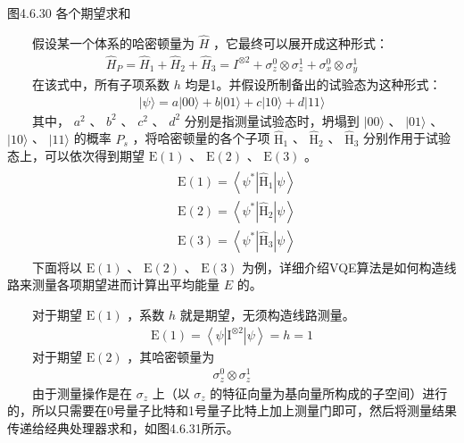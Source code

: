 \documentclass[a4paper,11pt,english]{sphinxmanual}
\begin{document}
\begin{center}图4.6.30 各个期望求和
\end{center}
\sphinxAtStartPar
  假设某一个体系的哈密顿量为 \(\hat{H}\) ，它最终可以展开成这种形式：
\begin{equation*}
\begin{split}\hat{H}_{P}=\hat{H}_{1}+\hat{H}_{2}+\hat{H}_{3}=I^{\otimes 2}+\sigma_{z}^{0} \otimes \sigma_{z}^{1}+\sigma_{x}^{0} \otimes \sigma_{y}^{1}\end{split}
\end{equation*}
\sphinxAtStartPar
  在该式中，所有子项系数  \(h\) 均是1。并假设所制备出的试验态为这种形式：
\begin{equation*}
\begin{split}|\psi\rangle=a|00\rangle +b| 01\rangle+c|10\rangle +d| 11\rangle\end{split}
\end{equation*}
\sphinxAtStartPar
  其中， \(a^2\) 、 \(b^2\) 、 \(c^2\) 、 \(d^2\) 分别是指测量试验态时，坍塌到 \(|00 \rangle\) 、 \(|01\rangle\) 、 \(|10\rangle\) 、 \(|11\rangle\) 的概率 \(P_s\) ，将哈密顿量的各个子项 \(\mathrm{\hat{H}}_1\) 、 \(\mathrm{\hat{H}}_2\) 、 \(\mathrm{\hat{H}}_3\) 分别作用于试验态上，可以依次得到期望 \(\mathrm{E}(1)\) 、 \(\mathrm{E}(2)\) 、 \(\mathrm{E}(3)\) 。
\begin{equation*}
\begin{split}\begin{aligned} &\mathrm{E}(1)=\left\langle\psi^{*}\left|\mathrm{\hat{H}}_{1}\right| \psi\right\rangle \\ &\mathrm{E}(2)=\left\langle\psi^{*}\left|\mathrm{\hat{H}}_{2}\right| \psi\right\rangle \\ &\mathrm{E}(3)=\left\langle\psi^{*}\left|\mathrm{\hat{H}}_{3}\right| \psi\right\rangle \end{aligned}\end{split}
\end{equation*}
\sphinxAtStartPar
  下面将以 \(\mathrm{E}(1)\) 、 \(\mathrm{E}(2)\) 、 \(\mathrm{E}(3)\) 为例，详细介绍VQE算法是如何构造线路来测量各项期望进而计算出平均能量 \(E\) 的。

\sphinxAtStartPar
  对于期望 \(\mathrm{E}(1)\) ，系数  \(h\) 就是期望，无须构造线路测量。
\begin{equation*}
\begin{split}\mathrm{E}(1)=\left\langle\psi\left|\mathrm{I}^{\otimes 2}\right| \psi\right\rangle=h=1\end{split}
\end{equation*}
\sphinxAtStartPar
  对于期望 \(\mathrm{E}(2)\) ，其哈密顿量为
\begin{equation*}
\begin{split}\sigma_{z}^{0} \otimes \sigma_{z}^{1}\end{split}
\end{equation*}
\sphinxAtStartPar
  由于测量操作是在 \(\sigma_{z}\) 上（以 \(\sigma_{z}\) 的特征向量为基向量所构成的子空间）进行的，所以只需要在0号量子比特和1号量子比特上加上测量门即可，然后将测量结果传递给经典处理器求和，如图4.6.31所示。
\end{document}
